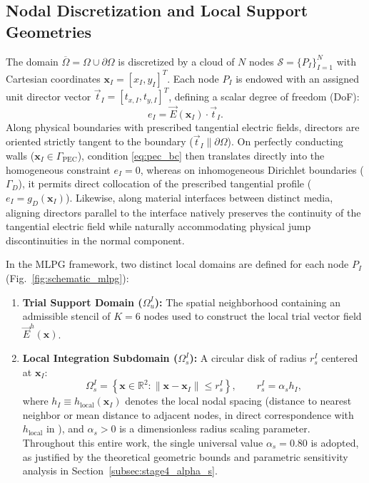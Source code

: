\documentclass[preprint,12pt]{elsarticle}
\begin{document}
\subsection{Nodal Discretization and Local Support Geometries}
\label{subsec:nodal_discretization}

The domain $\overline{\Omega} = \Omega \cup \partial\Omega$ is discretized by a cloud of $N$ nodes $\mathcal{S} = \{P_I\}_{I=1}^N$ with Cartesian coordinates $\mathbf{x}_I = [x_I, y_I]^T$. Each node $P_I$ is endowed with an assigned unit director vector $\vec{t}_I = [t_{x,I}, t_{y,I}]^T$, defining a scalar degree of freedom (DoF):
\begin{equation}
    e_I = \vec{E}(\mathbf{x}_I) \cdot \vec{t}_I.
\end{equation}
Along physical boundaries with prescribed tangential electric fields, directors are oriented strictly tangent to the boundary ($\vec{t}_I \parallel \partial\Omega$). On perfectly conducting walls ($\mathbf{x}_I \in \Gamma_{\mathrm{PEC}}$), condition \eqref{eq:pec_bc} then translates directly into the homogeneous constraint $e_I = 0$, whereas on inhomogeneous Dirichlet boundaries ($\Gamma_D$), it permits direct collocation of the prescribed tangential profile ($e_I = g_D(\mathbf{x}_I)$). Likewise, along material interfaces between distinct media, aligning directors parallel to the interface natively preserves the continuity of the tangential electric field while naturally accommodating physical jump discontinuities in the normal component.

In the MLPG framework, two distinct local domains are defined for each node $P_I$ (Fig.~\ref{fig:schematic_mlpg}):
\begin{enumerate}
    \item \textbf{Trial Support Domain ($\Omega_u^I$):} The spatial neighborhood containing an admissible stencil of $K = 6$ nodes used to construct the local trial vector field $\vec{E}^h(\mathbf{x})$.
    \item \textbf{Local Integration Subdomain ($\Omega_s^I$):} A circular disk of radius $r_s^I$ centered at $\mathbf{x}_I$:
          \begin{equation}
              \Omega_s^I = \left\{ \mathbf{x} \in \mathbb{R}^2 : \|\mathbf{x} - \mathbf{x}_I\| \le r_s^I \right\}, \qquad r_s^I = \alpha_s h_I,
              \label{eq:subdomain_disk}
          \end{equation}
          where $h_I \equiv h_{\mathrm{local}}(\mathbf{x}_I)$ denotes the local nodal spacing (distance to nearest neighbor or mean distance to adjacent nodes, in direct correspondence with $h_{\mathrm{local}}$ in \cite{stable_vnmm2d_2026}), and $\alpha_s > 0$ is a dimensionless radius scaling parameter. Throughout this entire work, the single universal value $\alpha_s = 0.80$ is adopted, as justified by the theoretical geometric bounds and parametric sensitivity analysis in Section~\ref{subsec:stage4_alpha_s}.
\end{enumerate}
\end{document}
